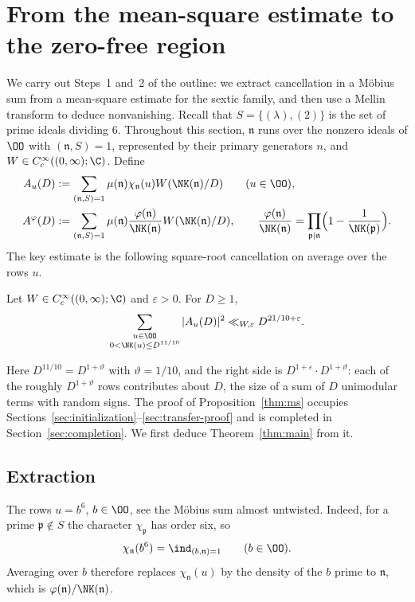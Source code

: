 \section{From the mean-square estimate to the zero-free region}\label{sec:reduction}

We carry out Steps~1 and~2 of the outline: we extract cancellation in a M\"obius sum from a
mean-square estimate for the sextic family, and then use a Mellin transform to deduce
nonvanishing. Recall that $S=\{(\lambda),(2)\}$ is the set of prime ideals dividing $6$.
Throughout this section, $\mathfrak n$ runs over the nonzero ideals of $\OO$ with
$(\mathfrak n,S)=1$, represented by their primary generators $n$, and
$W\in C_c^\infty((0,\infty);\C)$. Define
\begin{align}
 A_u(D)&:=\sum_{(\mathfrak n,S)=1}\mu(\mathfrak n)\chi_{\mathfrak n}(u)W(\NK(\mathfrak n)/D)
 \qquad(u\in\OO),\label{eq:A-u}\\
 A^\varphi(D)&:=\sum_{(\mathfrak n,S)=1}\mu(\mathfrak n)
 \frac{\varphi(\mathfrak n)}{\NK(\mathfrak n)}W(\NK(\mathfrak n)/D),
 \qquad
 \frac{\varphi(\mathfrak n)}{\NK(\mathfrak n)}=\prod_{\mathfrak p\mid\mathfrak n}
 \Bigl(1-\frac1{\NK(\mathfrak p)}\Bigr).\label{eq:A-phi}
\end{align}
The key estimate is the following square-root cancellation on average over the rows $u$.

\begin{proposition}\label{thm:ms}
Let $W\in C_c^\infty((0,\infty);\C)$ and $\varepsilon>0$. For $D\ge1$,
\begin{equation}\label{eq:ms}
 \sum_{\substack{u\in\OO\\0<\NK(u)\le D^{11/10}}}|A_u(D)|^2
       \ll_{W,\varepsilon}D^{21/10+\varepsilon}.
\end{equation}
\end{proposition}

Here $D^{11/10}=D^{1+\vartheta}$ with $\vartheta=1/10$, and the right side is
$D^{1+\varepsilon}\cdot D^{1+\vartheta}$: each of the roughly $D^{1+\vartheta}$ rows contributes
about $D$, the size of a sum of $D$ unimodular terms with random signs. The proof of
Proposition~\ref{thm:ms} occupies Sections~\ref{sec:initialization}--\ref{sec:transfer-proof} and is
completed in Section~\ref{sec:completion}. We first deduce Theorem~\ref{thm:main} from it.

\subsection{Extraction}
The rows $u=b^6$, $b\in\OO$, see the M\"obius sum almost untwisted. Indeed, for a prime
$\mathfrak p\notin S$ the character $\chi_{\mathfrak p}$ has order six, so
\begin{equation}\label{eq:sixth-power-rows}
 \chi_{\mathfrak n}(b^6)=\ind_{(b,\mathfrak n)=1}\qquad(b\in\OO).
\end{equation}
Averaging over $b$ therefore replaces $\chi_{\mathfrak n}(u)$ by the density of the $b$ prime
to $\mathfrak n$, which is $\varphi(\mathfrak n)/\NK(\mathfrak n)$.

